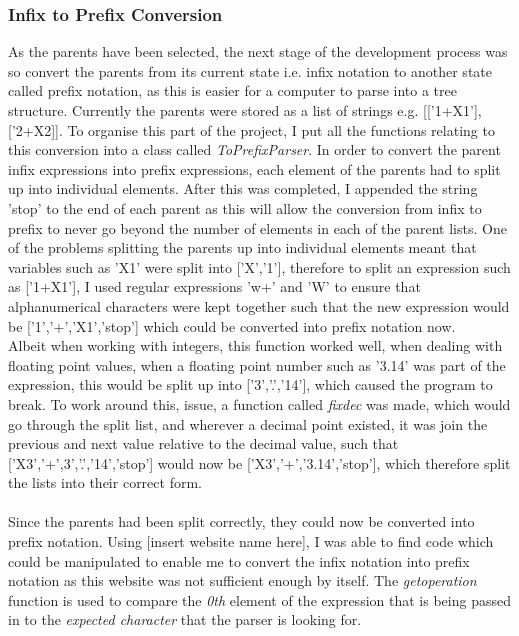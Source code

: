 \documentclass[11pt]{article}
\begin{document}
\subsubsection{Infix to Prefix Conversion}
As the parents have been selected, the next stage of the development process was so convert the parents from its current state i.e. infix notation to another state called prefix notation, as this is easier for a computer to parse into a tree structure.  Currently the parents were stored as a list of strings e.g. [['1+X1'],['2+X2]].
To organise this part of the project, I put all the functions relating to this conversion into a class called \textit{ToPrefixParser}. In order to convert the parent infix expressions into prefix expressions, each element of the parents had to split up into individual elements. After this was completed, I appended the string 'stop' to the end of each parent as this will allow the conversion from infix to prefix to never go beyond the number of elements in each of the parent lists. One of the problems splitting the parents up into individual elements meant that variables such as 'X1' were split into ['X','1'], therefore to split an expression such as ['1+X1'], I used regular expressions 'w+' and 'W' to ensure that alphanumerical characters were kept together such that the new expression would be ['1','+','X1','stop'] which could be converted into prefix notation now. \\
Albeit when working with integers, this function worked well, when dealing with floating point values, when a floating point number such as '3.14' was part of the expression, this would be split up into ['3','.','14'], which caused the program to break. To work around this, issue, a function called  \textit{fix\textunderscore dec} was made, which would go through the split list, and wherever a decimal point existed, it was join the previous and next value relative to the decimal value, such that ['X3','+',3','.','14','stop'] would now be ['X3','+','3.14','stop'], which therefore split the lists into their correct form. \\
\\
Since the parents had been split correctly, they could now be converted into prefix notation. Using [insert website name here], I was able to find code which could be manipulated to enable me to convert the infix notation into prefix notation as this website was not sufficient enough by itself. The \textit{get\textunderscore operation}  function is used to compare the \textit{0th} element of the expression that is being passed in to the \textit{expected character} that the parser is looking for.
\end{document}
